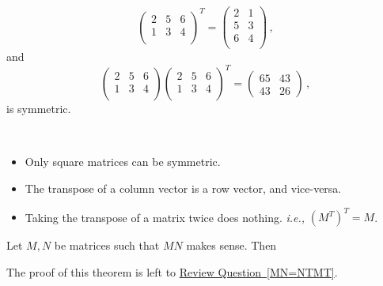 \begin{example}
$$\begin{pmatrix}
2 & 5 & 6\\
1 & 3 & 4\\
\end{pmatrix}^T = 
\begin{pmatrix}
2 & 1 \\
5 & 3 \\
6 & 4 \\
\end{pmatrix}\, ,$$
and
$$
\begin{pmatrix}
2 & 5 & 6\\
1 & 3 & 4\\
\end{pmatrix}
\begin{pmatrix}
2 & 5 & 6\\
1 & 3 & 4\\
\end{pmatrix}^T = 
\begin{pmatrix}
65&43\\43&26
\end{pmatrix}\, ,$$
is symmetric.


\end{example}


\begin{remark}[Observations]

$\phantom{test}$

\begin{itemize}
\item Only square matrices can be symmetric.

\item The transpose of a column vector is a row vector, and vice-versa. 

\item Taking the transpose of a matrix twice does nothing.  \emph{i.e.,} $(M^T)^T=M$.
\end{itemize}
\end{remark}

\begin{theorem}
Let $M, N$ be matrices such that $MN$ makes sense.  Then 
\end{theorem}
The proof of this theorem is left to \hyperref[MN=NTMT]{Review Question~\ref*{MN=NTMT}}.

